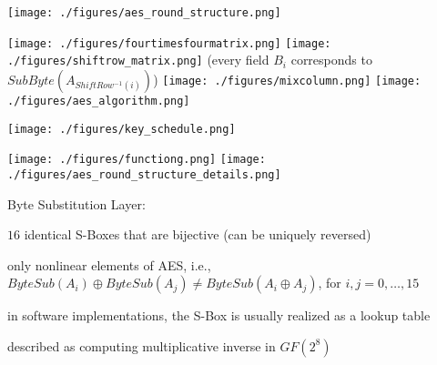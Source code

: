 \documentclass[landscape, a4paper]{article}
\begin{document}
\begin{minipage}[t]{0.2\linewidth}
\begin{betterlist}
\begin{betterlist}
		\end{betterlist}
		\begin{minipage}[b]{0.64\linewidth}
			\texttt{[image: ./figures/aes\_round\_structure.png]}
		\end{minipage}
		\begin{minipage}[b]{0.34\linewidth}
			\texttt{[image: ./figures/fourtimesfourmatrix.png]}
			\texttt{[image: ./figures/shiftrow\_matrix.png]} (every field $B_i$ corresponds to $SubByte(A_{ShiftRow^{-1}(i)})$)
			\texttt{[image: ./figures/mixcolumn.png]}
			\texttt{[image: ./figures/aes\_algorithm.png]}
		\end{minipage}
		\begin{minipage}[b]{0.49\linewidth}
			\texttt{[image: ./figures/key\_schedule.png]}
		\end{minipage}
		\begin{minipage}[b]{0.49\linewidth}
			\texttt{[image: ./figures/functiong.png]}
			\texttt{[image: ./figures/aes\_round\_structure\_details.png]}
		\end{minipage}
		\begin{betterlist}
			\item \alert{Byte Substitution Layer:}
			\begin{betterlist}
				\item $16$ \alert{identical} S-Boxes that are \alert{bijective} (can be \alert{uniquely reversed})
				\item only \alert{nonlinear} elements of AES, i.e., $ByteSub(A_i) \oplus ByteSub(A_j) \ne ByteSub(A_i \oplus A_j)$, for $i, j = 0,\ldots,15$
				\item in software implementations, the S-Box is usually realized as a lookup table
				\item described as computing \alert{multiplicative inverse} in $GF(2^8)$


\end{betterlist}
\end{betterlist}
\end{betterlist}
\end{minipage}
\end{document}
